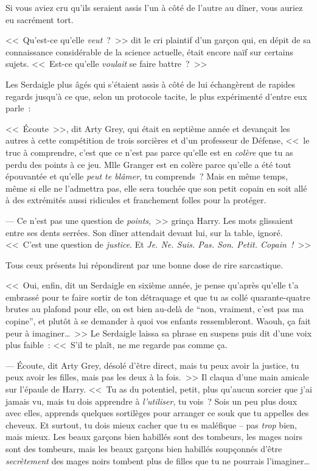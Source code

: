 \later

Si vous aviez cru qu'ils seraient assis l'un à côté de l'autre au dîner, vous auriez eu sacrément tort.

<<~Qu'est-ce qu'elle \emph{veut}~?~>> dit le cri plaintif d'un garçon qui, en dépit de sa connaissance considérable de la science actuelle, était encore naïf sur certains sujets. <<~Est-ce qu'elle \emph{voulait} se faire battre~?~>>

Les Serdaigle plus âgés qui s'étaient assis à côté de lui échangèrent de rapides regards jusqu'à ce que, selon un protocole tacite, le plus expérimenté d'entre eux parle~:

<<~Écoute~>>, dit Arty Grey, qui était en septième année et devançait les autres à cette compétition de trois sorcières et d'un professeur de Défense, <<~le truc à comprendre, c'est que ce n'est pas parce qu'elle est en \emph{colère} que tu as perdu des points à ce jeu. Mlle Granger est en colère parce qu'elle a été tout épouvantée et qu'elle \emph{peut te blâmer}, tu comprends~? Mais en même temps, même si elle ne l'admettra pas, elle sera touchée que son petit copain en soit allé à des extrémités aussi ridicules et franchement folles pour la protéger.

--- Ce n'est pas une question de \emph{points},~>> grinça Harry. Les mots glissaient entre ses dents serrées. Son dîner attendait devant lui, sur la table, ignoré. <<~C'est une question de \emph{justice}. Et \emph{Je. Ne. Suis. Pas. Son. Petit. Copain~!}~>>

Tous ceux présents lui répondirent par une bonne dose de rire sarcastique.

<<~Oui, enfin, dit un Serdaigle en sixième année, je pense qu'après qu'elle t'a embrassé pour te faire sortir de ton détraquage et que tu as collé quarante-quatre brutes au plafond pour elle, on est bien au-delà de “non, vraiment, c'est pas ma copine”, et plutôt à se demander à quoi vos enfants ressembleront. Waouh, ça fait peur à imaginer…~>> Le Serdaigle laissa sa phrase en suspens puis dit d'une voix plus faible~: <<~S'il te plaît, ne me regarde pas comme ça.

--- Écoute, dit Arty Grey, désolé d'être direct, mais tu peux avoir la justice, tu peux avoir les filles, mais pas les deux à la fois.~>> Il claqua d'une main amicale sur l'épaule de Harry. <<~Tu as du potentiel, petit, plus qu'aucun sorcier que j'ai jamais vu, mais tu dois apprendre à \emph{l'utiliser}, tu vois~? Sois un peu plus doux avec elles, apprends quelques sortilèges pour arranger ce souk que tu appelles des cheveux. Et surtout, tu dois mieux cacher que tu es maléfique -- pas \emph{trop} bien, mais mieux. Les beaux garçons bien habillés sont des tombeurs, les mages noirs sont des tombeurs, mais les beaux garçons bien habillés soupçonnés d'être \emph{secrètement} des mages noirs tombent plus de filles que tu ne pourrais l'imaginer…

